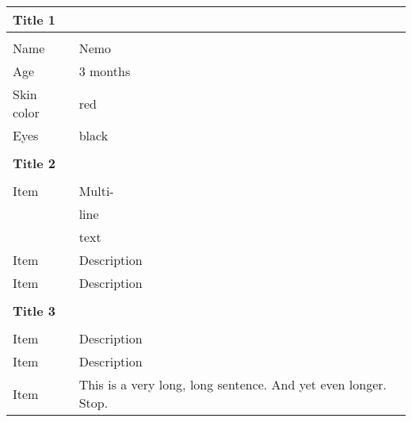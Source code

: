 \documentclass[a4paper,11pt]{article}
\begin{document}


\begin{tabular}{ll}
\textbf{Title 1}\\\hline\\
Name  &Nemo\\
Age &3 months\\
Skin color &red\\
Eyes &black\\
\\
\multicolumn{2}{l}{\textbf{Title 2}}\\\hline\\
Item &Multi-\\&line\\&text\\
Item &Description\\
Item &Description\\
\\
\textbf{Title 3}\\\hline\\
Item &Description\\
Item &Description\\
Item &This is a very long, long sentence. And yet even longer. Stop.\\
\end{tabular}
\end{document}
